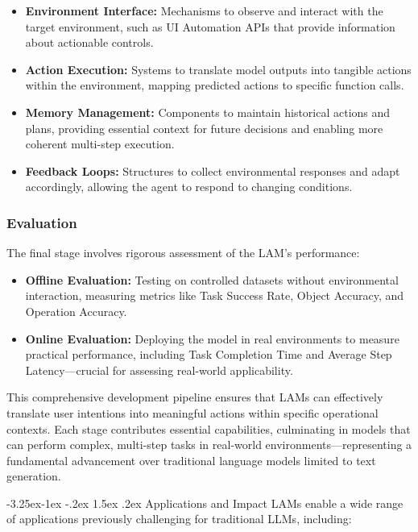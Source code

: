 \documentclass[journal,twoside,10pt]{IEEEtran}
\makeatletter
\renewcommand\subsection{\@startsection{subsection}{2}{\z@}%
                       {-3.25ex\@plus -1ex \@minus -.2ex}%
                       {1.5ex \@plus .2ex}%
                       {\normalfont\large\bfseries}}
\makeatother
\begin{document}
\begin{itemize}
    \item \textbf{Environment Interface:} Mechanisms to observe and interact with the target environment, such as UI Automation APIs that provide information about actionable controls.
    
    \item \textbf{Action Execution:} Systems to translate model outputs into tangible actions within the environment, mapping predicted actions to specific function calls.
    
    \item \textbf{Memory Management:} Components to maintain historical actions and plans, providing essential context for future decisions and enabling more coherent multi-step execution.
    
    \item \textbf{Feedback Loops:} Structures to collect environmental responses and adapt accordingly, allowing the agent to respond to changing conditions.
\end{itemize}

\subsubsection{Evaluation}
The final stage involves rigorous assessment of the LAM's performance:

\begin{itemize}
    \item \textbf{Offline Evaluation:} Testing on controlled datasets without environmental interaction, measuring metrics like Task Success Rate, Object Accuracy, and Operation Accuracy.
    
    \item \textbf{Online Evaluation:} Deploying the model in real environments to measure practical performance, including Task Completion Time and Average Step Latency—crucial for assessing real-world applicability.
\end{itemize}

This comprehensive development pipeline ensures that LAMs can effectively translate user intentions into meaningful actions within specific operational contexts. Each stage contributes essential capabilities, culminating in models that can perform complex, multi-step tasks in real-world environments—representing a fundamental advancement over traditional language models limited to text generation.

\subsection{Applications and Impact}
LAMs enable a wide range of applications previously challenging for traditional LLMs, including:
\end{document}
